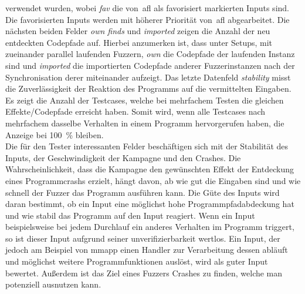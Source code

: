 verwendet wurden, wobei \textit{fav} die von~\gls{afl} als favorisiert markierten Inputs sind.
Die favorisierten Inputs werden mit höherer Priorität von~\gls{afl} abgearbeitet.
Die nächsten beiden Felder \textit{own finds} und \textit{imported} zeigen die Anzahl der neu entdeckten Codepfade auf.
Hierbei anzumerken ist, dass unter Setups, mit zueinander parallel laufenden Fuzzern, \textit{own} die Codepfade der laufenden
Instanz sind und \textit{imported} die importierten Codepfade anderer Fuzzerinstanzen nach der Synchronisation derer miteinander aufzeigt.
Das letzte Datenfeld \textit{stability} misst die Zuverlässigkeit der Reaktion des Programms auf die vermittelten Eingaben.
Es zeigt die Anzahl der Testcases, welche bei mehrfachem Testen die gleichen Effekte/Codepfade erreicht haben.
Somit wird, wenn alle Testcases nach mehrfachem dasselbe Verhalten in einem Programm hervorgerufen haben, die Anzeige bei
\SI{100}{\percent} bleiben. \\
\linebreak
Die für den Tester interessanten Felder beschäftigen sich mit der Stabilität des Inputs, der Geschwindigkeit der Kampagne
und den Crashes.
Die Wahrscheinlichkeit, dass die Kampagne den gewünschten Effekt der Entdeckung eines Programmcrashs erzielt, hängt davon,
ab wie gut die Eingaben sind und wie schnell der Fuzzer das Programm ausführen kann.
Die Güte des Inputs wird daran bestimmt, ob ein Input eine möglichst hohe Programmpfadabdeckung hat und wie stabil das Programm
auf den Input reagiert.
Wenn ein Input beispielsweise bei jedem Durchlauf ein anderes Verhalten im Programm triggert, so ist dieser Input aufgrund
seiner unverifizierbarkeit wertlos.
Ein Input, der jedoch am Beispiel von mmapp einen Handler zur Verarbeitung dessen abläuft und möglichst weitere Programmfunktionen
auslöst, wird als guter Input bewertet.
Außerdem ist das Ziel eines Fuzzers Crashes zu finden, welche man potenziell ausnutzen kann.